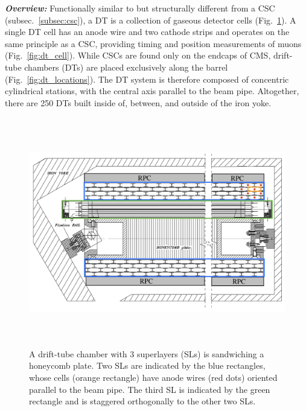 \textbf{\textit{Overview:}}
Functionally similar to but structurally different from a CSC (subsec.~\ref{subsec:csc}), a DT is a collection of gaseous detector cells (Fig.~\ref{fig:dt_superlayers}).
A single DT cell has an anode wire and two cathode strips and operates on the same principle as a CSC, providing timing and position measurements of muons (Fig.~\ref{fig:dt_cell}).
While CSCs are found only on the endcaps of CMS, drift-tube chambers (DTs) are placed exclusively along the barrel (Fig.~\ref{fig:dt_locations}).
The DT system is therefore composed of concentric cylindrical stations, with the central axis parallel to the beam pipe.
Altogether, there are 250 DTs built inside of, between, and outside of the iron yoke.
\begin{figure}[pbth]
    \centering
    \includegraphics[width=15cm,height=10cm,keepaspectratio]{figures/cms/muonsys/drifttube_superlayers.jpeg}
        \caption{
        A drift-tube chamber with 3 superlayers (SLs) is sandwiching a honeycomb plate.
        Two SLs are indicated by the blue rectangles, whose cells (orange rectangle) have anode wires (red dots) oriented parallel to the beam pipe.
        The third SL is indicated by the green rectangle and is staggered orthogonally to the other two SLs.
        }
        \label{fig:dt_superlayers}
\end{figure}
